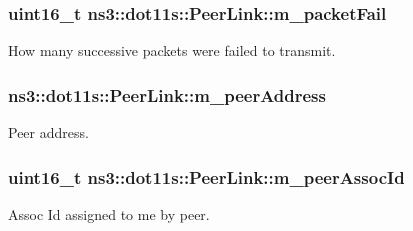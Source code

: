 \subsubsection[{\texorpdfstring{m\+\_\+packet\+Fail}{m_packetFail}}]{\setlength{\rightskip}{0pt plus 5cm}uint16\+\_\+t ns3\+::dot11s\+::\+Peer\+Link\+::m\+\_\+packet\+Fail\hspace{0.3cm}{\ttfamily [private]}}\hypertarget{classns3_1_1dot11s_1_1PeerLink_ae49bf34d417c48dcd6747b62d7b9499b}{}\label{classns3_1_1dot11s_1_1PeerLink_ae49bf34d417c48dcd6747b62d7b9499b}


How many successive packets were failed to transmit. 

\subsubsection[{\texorpdfstring{m\+\_\+peer\+Address}{m_peerAddress}}]{ ns3\+::dot11s\+::\+Peer\+Link\+::m\+\_\+peer\+Address\hspace{0.3cm}{\ttfamily [private]}}\hypertarget{classns3_1_1dot11s_1_1PeerLink_ab442de76f74778662919cc3d3d51cdd8}{}\label{classns3_1_1dot11s_1_1PeerLink_ab442de76f74778662919cc3d3d51cdd8}


Peer address. 

\subsubsection[{\texorpdfstring{m\+\_\+peer\+Assoc\+Id}{m_peerAssocId}}]{\setlength{\rightskip}{0pt plus 5cm}uint16\+\_\+t ns3\+::dot11s\+::\+Peer\+Link\+::m\+\_\+peer\+Assoc\+Id\hspace{0.3cm}{\ttfamily [private]}}\hypertarget{classns3_1_1dot11s_1_1PeerLink_a732db7f1857d5f3a56d5c5fccbe66cb4}{}\label{classns3_1_1dot11s_1_1PeerLink_a732db7f1857d5f3a56d5c5fccbe66cb4}


Assoc Id assigned to me by peer. 

